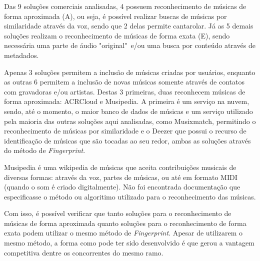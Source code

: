Das 9 soluções comerciais analisadas, 4 possuem reconhecimento de músicas de forma aproximada (A), ou seja, é possível realizar buscas de músicas por similaridade através da voz, sendo que 2 delas permite cantarolar. Já as 5 demais soluções realizam o reconhecimento de músicas de forma exata (E), sendo necessária uma parte de áudio "original"\ e/ou uma busca por conteúdo através de metadados.

Apenas 3 soluções permitem a inclusão de músicas criadas por usuários, enquanto as outras 6 permitem a inclusão de novas músicas somente através de contatos com gravadoras e/ou artistas. Destas 3 primeiras, duas reconhecem músicas de forma aproximada: ACRCloud e Musipedia. A primeira é um serviço na nuvem, sendo, até o momento, o maior banco de dados de músicas e um serviço utilizado pela maioria das outras soluções aqui analisadas, como Musixmatch, permitindo o reconhecimento de músicas por similaridade e o Deezer que possui o recurso de identificação de músicas que são tocadas ao seu redor, ambas as soluções através do método de \textit{Fingerprint}.


Musipedia é uma wikipedia de músicas que aceita contribuições musicais de diversas formas: através da voz, partes de músicas, ou até em formato MIDI (quando o som é criado digitalmente). Não foi encontrada documentação que especificasse o método ou algoritimo utilizado para o reconhecimento das músicas.


Com isso, é possível verificar que tanto soluções para o reconhecimento de músicas de forma aproximada quanto soluções para o reconhecimento de forma exata podem utilizar o mesmo método de \textit{Fingerprint}. Apesar de utilizarem o mesmo método, a forma como pode ter sido desenvolvido é que gerou a vantagem competitiva dentre os concorrentes do mesmo ramo.

